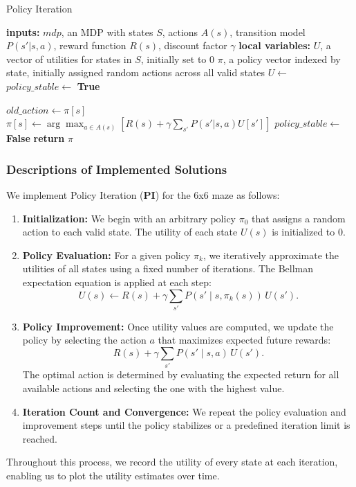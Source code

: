 \documentclass[11pt]{article}
\begin{document}
\begin{algorithm}
\caption{Policy Iteration}
\label{alg:policy_iteration}
\begin{algorithmic}[1]
    \State \textbf{inputs:} $mdp$, an MDP with states $S$, actions $A(s)$, transition model $P(s'|s,a)$, reward function $R(s)$, discount factor $\gamma$
    \State \textbf{local variables:} 
    \Indent
        \State $U$, a vector of utilities for states in $S$, initially set to $0$
        \State $\pi$, a policy vector indexed by state, initially assigned random actions across all valid states
    \EndIndent
    \Repeat
        \State $U \gets$ 
        \State $policy\_stable \gets$ \textbf{True}
        
            \State $old\_action \gets \pi[s]$
            \State $\pi[s] \gets \arg\max_{a \in A(s)} \left[ R(s) + \gamma \sum_{s'} P(s'|s,a) U[s'] \right]$
                \State $policy\_stable \gets$ \textbf{False}
            \EndIf
        \EndFor
    \State \textbf{return} $\pi$
\EndFunction
\end{algorithmic}
\end{algorithm}

\newpage
\subsubsection{Descriptions of Implemented Solutions}
We implement Policy Iteration (\textbf{PI}) for the 6x6 maze as follows:
\begin{enumerate}
    \item \textbf{Initialization:} We begin with an arbitrary policy $\pi_0$ that assigns a random action to each valid state. The utility of each state $U(s)$ is initialized to 0.
    \item \textbf{Policy Evaluation:} For a given policy $\pi_k$, we iteratively approximate the utilities of all states using a fixed number of iterations. The Bellman expectation equation is applied at each step:
    \[
    U(s) \leftarrow R(s) + \gamma \sum_{s'} P(s' \mid s, \pi_k(s))\, U(s').
    \]
    \item \textbf{Policy Improvement:} Once utility values are computed, we update the policy by selecting the action $a$ that maximizes expected future rewards:
    \[
    R(s) + \gamma \sum_{s'} P(s' \mid s,a)\,U(s').
    \]
    The optimal action is determined by evaluating the expected return for all available actions and selecting the one with the highest value.
    \item \textbf{Iteration Count and Convergence:} We repeat the policy evaluation and improvement steps until the policy stabilizes or a predefined iteration limit is reached.
\end{enumerate}
Throughout this process, we record the utility of every state at each iteration, enabling us to plot the utility estimates over time.
\end{document}
